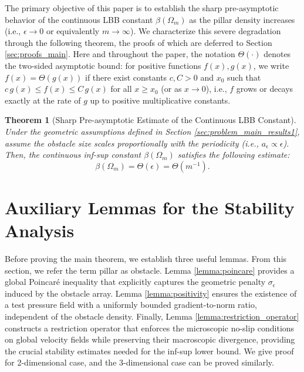 \documentclass{elsarticle}
\newtheorem{theorem}{Theorem}
\begin{document}
The primary objective of this paper is to establish the sharp pre-asymptotic behavior of the continuous LBB constant $\beta(\Omega_m)$ as the pillar density increases (i.e., $\epsilon \to 0$ or equivalently $m \to \infty$). We characterize this severe degradation through the following theorem, the proofs of which are deferred to Section \ref{sec:proofs_main}. Here and throughout the paper, the notation $\Theta(\cdot)$ denotes the two-sided asymptotic bound: for positive functions $f(x), g(x)$, we write $f(x) = \Theta(g(x))$ if there exist constants $c, C > 0$ and $x_0$ such that $c \, g(x) \le f(x) \le C \, g(x)$ for all $x \ge x_0$ (or as $x \to 0$), i.e., $f$ grows or decays exactly at the rate of $g$ up to positive multiplicative constants.

\begin{theorem}[Sharp Pre-asymptotic Estimate of the Continuous LBB Constant]\label{thm:main_scaling}
    Under the geometric assumptions defined in Section \ref{sec:problem_main_results1}, assume the obstacle size scales proportionally with the periodicity (i.e., $a_{\epsilon} \propto \epsilon$). Then, the continuous inf-sup constant $\beta(\Omega_m)$ satisfies the following estimate:
    \begin{equation}
        \beta(\Omega_m) = \Theta(\epsilon) = \Theta(m^{-1}).
    \end{equation}
\end{theorem}

\section{Auxiliary Lemmas for the Stability Analysis}\label{sec:proofs}

Before proving the main theorem, we establish three useful lemmas. From this section, we refer the term pillar as obstacle. Lemma \ref{lemma:poincare} provides a global Poincaré inequality that explicitly captures the geometric penalty $\sigma_{\epsilon}$ induced by the obstacle array. Lemma \ref{lemma:positivity} ensures the existence of a test pressure field with a uniformly bounded gradient-to-norm ratio, independent of the obstacle density. Finally, Lemma \ref{lemma:restriction_operator} constructs a restriction operator that enforces the microscopic no-slip conditions on global velocity fields while preserving their macroscopic divergence, providing the crucial stability estimates needed for the inf-sup lower bound. We give proof for 2-dimensional case, and the 3-dimensional case can be proved similarly.
\end{document}
